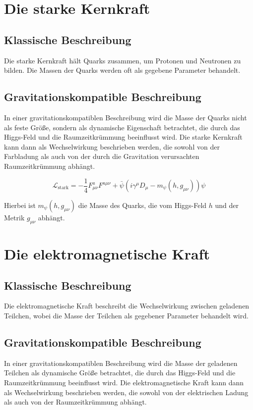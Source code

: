 \documentclass{article}
\begin{document}
	\section{Die starke Kernkraft}
	
	\subsection{Klassische Beschreibung}
	Die starke Kernkraft hält Quarks zusammen, um Protonen und Neutronen zu bilden. Die Massen der Quarks werden oft als gegebene Parameter behandelt.
	
	\subsection{Gravitationskompatible Beschreibung}
	In einer gravitationskompatiblen Beschreibung wird die Masse der Quarks nicht als feste Größe, sondern als dynamische Eigenschaft betrachtet, die durch das Higgs-Feld und die Raumzeitkrümmung beeinflusst wird. Die starke Kernkraft kann dann als Wechselwirkung beschrieben werden, die sowohl von der Farbladung als auch von der durch die Gravitation verursachten Raumzeitkrümmung abhängt.
	
	\begin{equation}
		\mathcal{L}_\text{stark} = -\frac{1}{4} F_{\mu\nu}^a F^{a\mu\nu} + \bar{\psi}(i \gamma^\mu D_\mu - m_\psi(h, g_{\mu\nu}))\psi
	\end{equation}
	
	Hierbei ist $m_\psi(h, g_{\mu\nu})$ die Masse des Quarks, die vom Higgs-Feld $h$ und der Metrik $g_{\mu\nu}$ abhängt.
	
	\section{Die elektromagnetische Kraft}
	
	\subsection{Klassische Beschreibung}
	Die elektromagnetische Kraft beschreibt die Wechselwirkung zwischen geladenen Teilchen, wobei die Masse der Teilchen als gegebener Parameter behandelt wird.
	
	\subsection{Gravitationskompatible Beschreibung}
	In einer gravitationskompatiblen Beschreibung wird die Masse der geladenen Teilchen als dynamische Größe betrachtet, die durch das Higgs-Feld und die Raumzeitkrümmung beeinflusst wird. Die elektromagnetische Kraft kann dann als Wechselwirkung beschrieben werden, die sowohl von der elektrischen Ladung als auch von der Raumzeitkrümmung abhängt.
	
\end{document}
